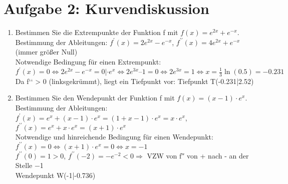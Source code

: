 \documentclass[11pt,a4paper, parskip=half ]{report}
\begin{document}
  \section*{Aufgabe 2: Kurvendiskussion}
\begin{enumerate}
  \item Bestimmen Sie die Extrempunkte der Funktion f mit $f(x) = e^{2x} + e^{-x}$.
  \vspace{20pt}
  \\Bestimmung der Ableitungen:	$f^{\prime}(x) =  2e^{2x} - e^{-x}$, $f^{\prime\prime}(x) =  4e^{2x} + e^{-x}$	(immer größer Null)\\
	Notwendige Bedingung für einen Extrempunkt:\\  
			$f^{\prime}(x) = 0	\Leftrightarrow  2e^{2x} - e^{-x} = 0 |\cdot e^x  	\Leftrightarrow 2e^{3x} – 1 = 0  \Leftrightarrow     2e^{3x} = 1
			\Leftrightarrow x= \frac{1}{3} \ln(0.5) = -0.231$\\				
	Da f‘‘ > 0 (linksgekrümmt), liegt ein Tiefpunkt vor:	Tiefpunkt T(-0.231|2.52) 

  \item Bestimmen Sie den Wendepunkt der Funktion f mit $f(x) = (x-1)\cdot e^x$.
  \vspace{20pt}
  \\Bestimmung der Ableitungen:  $f^{\prime}(x) = e^x + (x-1)\cdot e^x = (1+x-1)\cdot e^x = x\cdot e^x$, $f^{\prime\prime}(x) = e^x + x\cdot e^x = (x+1)\cdot e^x$	
  \\Notwendige und hinreichende Bedingung für einen Wendepunkt:  
  \\$f^{\prime\prime}(x) = 0	\Leftrightarrow   (x +1)\cdot e^x = 0   \Leftrightarrow x = -1$
  \\$f^{\prime\prime}(0) = 1> 0$, $f^{\prime\prime}(-2) = -e^{-2}< 0   \Rightarrow$ VZW von f′′ von + nach - an der Stelle \num{-1}	
  \\Wendepunkt W(-1|-0.736) 	

\end{enumerate}
\end{document}
